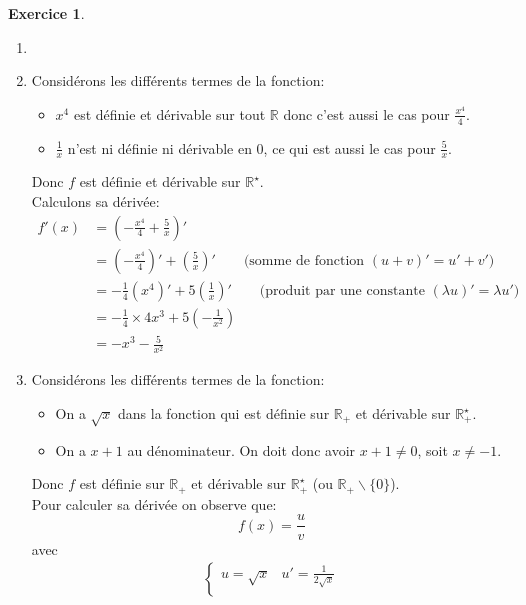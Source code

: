 \documentclass{exam}
\theoremstyle{definition}
\newtheorem{exercice}{Exercice}
\begin{document}
\begin{exercice}
    \begin{enumerate}
        \item[]
        \item Considérons les différents termes de la fonction:
        \begin{itemize}
            \item $x^4$ est définie et dérivable sur tout $\mathbb{R}$ donc c'est aussi le cas pour $\frac{x^4}{4}$.
            \item $\frac{1}{x}$ n'est ni définie ni dérivable en $0$, ce qui est aussi le cas pour $\frac{5}{x}$.
        \end{itemize}
        Donc $f$ est définie et dérivable sur $\mathbb{R}^\star$.\\
        Calculons sa dérivée:
        \begin{align*}
            f'(x) &= \left(-\frac{x^4}{4} + \frac{5}{x}\right)'\\
            &= \left(-\frac{x^4}{4}\right)' + \left(\frac{5}{x}\right)' \qquad \text{(somme de fonction $(u+v)' = u' + v'$)}\\
            &= -\frac{1}{4}\left(x^4\right)' + 5\left(\frac{1}{x}\right)' \qquad \text{(produit par une constante $(\lambda u)' = \lambda u')$}\\
            &= -\frac{1}{4}\times 4x^3 + 5 \left(-\frac{1}{x^2}\right)\\
            &= -x^3 - \frac{5}{x^2}
        \end{align*}
        \item Considérons les différents termes de la fonction:
        \begin{itemize}
            \item On a $\sqrt{x}$ dans la fonction qui est définie sur $\mathbb{R}_+$ et dérivable sur $\mathbb{R}_+^\star$.
            \item On a $x + 1$ au dénominateur. On doit donc avoir $x + 1 \neq 0$, soit $x \neq - 1$.
        \end{itemize}
        Donc $f$ est définie sur $\mathbb{R}_+$ et dérivable sur $\mathbb{R}_+^\star$ (ou $\mathbb{R}_+ \backslash \{ 0 \}$).\\
        Pour calculer sa dérivée on observe que:
        $$
        f(x) = \frac{u}{v}
        $$
        avec
        \begin{align*}
        \begin{cases}
            u = \sqrt{x} & u' = \frac{1}{2\sqrt{x}}\\

\end{cases}
\end{align*}
\end{enumerate}
\end{exercice}
\end{document}
